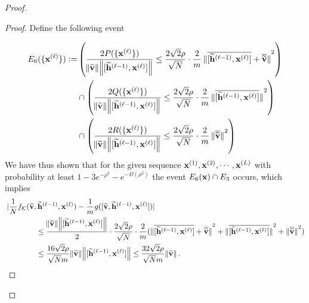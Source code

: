 \begin{proof}
\begin{proof}
		Define the following event 
		
		\begingroup\allowdisplaybreaks
		\begin{align*}
			E_6(\{\mathbf{x}^{(\ell)}\}) := &\left(\frac{2P(\{\mathbf{x}^{(\ell)}\})}{\norm{\widetilde{\mathbf{v}}} \norm{[\widetilde{\mathbf{h}}^{(\ell-1)},  \mathbf{x}^{(\ell)}]}} \leq \frac{2\sqrt{2} \rho}{ \sqrt{N} } \cdot \frac{2}{m}\norm[0]{\overline{[\widetilde{\mathbf{h}}^{(\ell-1)},  \mathbf{x}^{(\ell)}]} + \overline{\widetilde{\mathbf{v}}}}^2 \right) \\&
			\cap \left(\frac{2Q(\{\mathbf{x}^{(\ell)}\})}{\norm{\widetilde{\mathbf{v}}} \norm{[\widetilde{\mathbf{h}}^{(\ell-1)},  \mathbf{x}^{(\ell)}]}} \leq \frac{2\sqrt{2} \rho}{ \sqrt{N} } \cdot  \frac{2}{m}\norm[0]{\overline{[\widetilde{\mathbf{h}}^{(\ell-1)},  \mathbf{x}^{(\ell)}]}}^2 \right)  \\&
			\cap \left(\frac{2R(\{\mathbf{x}^{(\ell)}\})}{\norm{\widetilde{\mathbf{v}}} \norm{[\widetilde{\mathbf{h}}^{(\ell-1)},  \mathbf{x}^{(\ell)}]}} \leq \frac{2\sqrt{2} \rho}{ \sqrt{N} } \cdot \frac{2}{m}\norm[0]{\overline{\widetilde{\mathbf{v}}}}^2 \right)          \end{align*}
		\endgroup
		We have thus shown that for the given sequence $\mathbf{x}^{(1)}, \mathbf{x}^{(2)}, \cdots, \mathbf{x}^{(L)}$ with probability at least $1 - 3e^{-\rho^2} - e^{-\Omega(\rho^2)}$ the event $E_6(\mathbf{x}) \cap E_3$ occurs, which implies
		\begin{align}\label{eqn:fg-enet}
			&\abs[0]{\frac{1}{N}f_{\mathcal{K}}(\widetilde{\mathbf{v}}, \widetilde{\mathbf{h}}^{(\ell-1)}, \mathbf{x}^{(\ell)}) - \frac{1}{m}g([\widetilde{\mathbf{v}}, \widetilde{\mathbf{h}}^{(\ell-1)}, \mathbf{x}^{(\ell)}])} \nonumber\\& \quad\quad\quad\quad\leq \frac{\norm{\widetilde{\mathbf{v}}} \norm{[\widetilde{\mathbf{h}}^{(\ell-1)},  \mathbf{x}^{(\ell)}]}}{2} \cdot \frac{2\sqrt{2} \rho}{ \sqrt{N} } \cdot \frac{2}{m} (\norm[0]{\overline{[\widetilde{\mathbf{h}}^{(\ell-1)},  \mathbf{x}^{(\ell)}]} + \overline{\widetilde{\mathbf{v}}}}^2 + \norm[0]{\overline{[\widetilde{\mathbf{h}}^{(\ell-1)},  \mathbf{x}^{(\ell)}]}}^2 + \norm[0]{\overline{\widetilde{\mathbf{v}}}}^2) \\ \nonumber
			& \quad\quad\quad\quad\le \frac{16\sqrt{2} \rho}{ \sqrt{N} m} \norm{\widetilde{\mathbf{v}}} \norm{[\widetilde{\mathbf{h}}^{(\ell-1)},  \mathbf{x}^{(\ell)}]} \le \frac{32\sqrt{2} \rho}{ \sqrt{N} m} \norm{\widetilde{\mathbf{v}}}.
		\end{align} 

\end{proof}
\end{proof}
